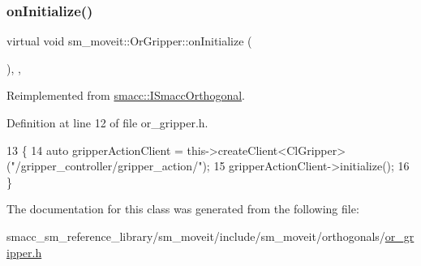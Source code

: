 \subsubsection{\texorpdfstring{on\+Initialize()}{onInitialize()}}
{\footnotesize\ttfamily virtual void sm\+\_\+moveit\+::\+Or\+Gripper\+::on\+Initialize (\begin{DoxyParamCaption}{ }\end{DoxyParamCaption})\hspace{0.3cm}{\ttfamily [inline]}, {\ttfamily [override]}, {\ttfamily [virtual]}}



Reimplemented from \hyperlink{classsmacc_1_1ISmaccOrthogonal_a6bb31c620cb64dd7b8417f8705c79c7a}{smacc\+::\+I\+Smacc\+Orthogonal}.



Definition at line 12 of file or\+\_\+gripper.\+h.


\begin{DoxyCode}
13     \{
14         \textcolor{keyword}{auto} gripperActionClient = this->createClient<ClGripper>(\textcolor{stringliteral}{"/gripper\_controller/gripper\_action/"});
15         gripperActionClient->initialize();
16     \}
\end{DoxyCode}


The documentation for this class was generated from the following file\+:\begin{DoxyCompactItemize}
\item 
smacc\+\_\+sm\+\_\+reference\+\_\+library/sm\+\_\+moveit/include/sm\+\_\+moveit/orthogonals/\hyperlink{include_2sm__moveit_2orthogonals_2or__gripper_8h}{or\+\_\+gripper.\+h}\end{DoxyCompactItemize}
